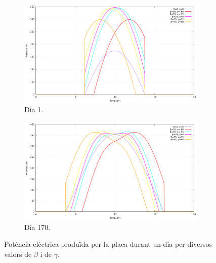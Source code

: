 \documentclass[11pt]{article}
\begin{document}
\begin{figure}[H]
    \centering
    \begin{subfigure}{0.5\textwidth}
        \centering
        \includegraphics[width=\textwidth]{dia1_pot_plot.png}
        \caption{Dia 1.}
        \label{fig: potencia dia 1}
    \end{subfigure}%
    \hspace{0.000001\textwidth}%
    \begin{subfigure}{0.5\textwidth}
        \centering
        \includegraphics[width=\textwidth]{dia170_pot_plot.png}
        \caption{Dia 170.}
        \label{fig: potencia dia 170}
    \end{subfigure}
    \caption{Potència elèctrica produïda per la placa durant un dia per diversos valors de $\beta$ i de $\gamma$.}
    \label{potencia un dia}
\end{figure}
\end{document}
